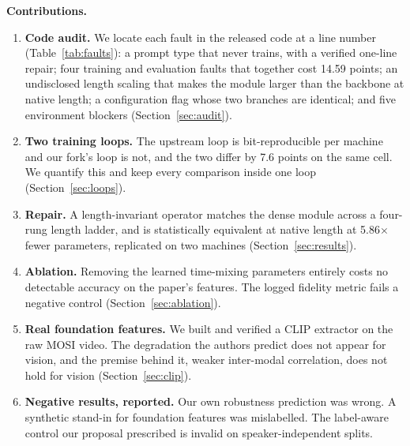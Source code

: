 \documentclass[lettersize,journal]{IEEEtran}
\begin{document}
\textbf{Contributions.}
\begin{enumerate}
\item \textbf{Code audit.} We locate each fault in the released code at a line number (Table~\ref{tab:faults}): a prompt type that never trains, with a verified one-line repair; four training and evaluation faults that together cost 14.59 points; an undisclosed length scaling that makes the module larger than the backbone at native length; a configuration flag whose two branches are identical; and five environment blockers (Section~\ref{sec:audit}).
\item \textbf{Two training loops.} The upstream loop is bit-reproducible per machine and our fork's loop is not, and the two differ by 7.6 points on the same cell. We quantify this and keep every comparison inside one loop (Section~\ref{sec:loops}).
\item \textbf{Repair.} A length-invariant operator matches the dense module across a four-rung length ladder, and is statistically equivalent at native length at 5.86$\times$ fewer parameters, replicated on two machines (Section~\ref{sec:results}).
\item \textbf{Ablation.} Removing the learned time-mixing parameters entirely costs no detectable accuracy on the paper's features. The logged fidelity metric fails a negative control (Section~\ref{sec:ablation}).
\item \textbf{Real foundation features.} We built and verified a CLIP extractor on the raw MOSI video. The degradation the authors predict does not appear for vision, and the premise behind it, weaker inter-modal correlation, does not hold for vision (Section~\ref{sec:clip}).
\item \textbf{Negative results, reported.} Our own robustness prediction was wrong. A synthetic stand-in for foundation features was mislabelled. The label-aware control our proposal prescribed is invalid on speaker-independent splits.
\end{enumerate}
\end{document}

